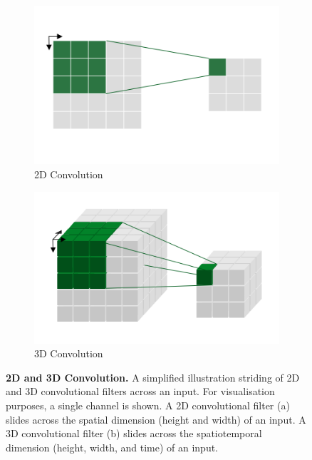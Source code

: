 \documentclass[a4paper]{article}
\begin{document}
\begin{figure}
  \centering
  \begin{subfigure}[b]{0.49\textwidth}
    \includegraphics[width=\textwidth]{./figures/2d-conv.png}
    \caption{2D Convolution}
  \end{subfigure}
  \hfill
  \begin{subfigure}[b]{0.49\textwidth}
    \includegraphics[width=\textwidth]{./figures/3d-conv.png}
    \caption{3D Convolution}
  \end{subfigure}
  \caption{
  \textbf{2D and 3D Convolution.} A simplified illustration striding of 2D and
  3D convolutional filters across an input. For visualisation purposes, a single
  channel is shown. A 2D convolutional filter (a) slides across the spatial
  dimension (height and width) of an input. A 3D convolutional filter (b) slides
across the spatiotemporal dimension (height, width, and time) of an input.}
  \label{fig:conv}
\end{figure}
\end{document}
